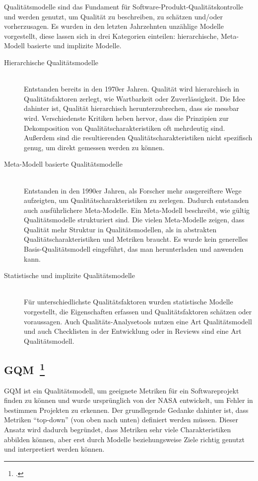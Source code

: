 Qualitätsmodelle sind das Fundament für Software-Produkt-Qualitätskontrolle und werden genutzt, um Qualität zu beschreiben, zu schätzen und/oder vorherzusagen.
Es wurden in den letzten Jahrzehnten unzählige Modelle vorgestellt, diese lassen sich in drei Kategorien einteilen: hierarchische, Meta-Modell basierte und implizite Modelle.

\begin{description}
  \item[Hierarchische Qualitätsmodelle] \hfill \\ Entstanden bereits in den 1970er Jahren. Qualität wird hierarchisch in Qualitätsfaktoren zerlegt, wie Wartbarkeit oder Zuverlässigkeit. Die Idee dahinter ist, Qualität hierarchisch herunterzubrechen, dass sie messbar wird. Verschiedenste Kritiken heben hervor, dass die Prinzipien zur Dekomposition von Qualitätscharakteristiken oft mehrdeutig sind. Außerdem sind die resultierenden Qualitätscharakteristiken nicht spezifisch genug, um direkt gemessen werden zu können.
  \item[Meta-Modell basierte Qualitätsmodelle] \hfill \\ Entstanden in den 1990er Jahren, als Forscher mehr ausgereiftere Wege aufzeigten, um Qualitätscharakteristiken zu zerlegen. Dadurch entstanden auch ausführlichere Meta-Modelle. Ein Meta-Modell beschreibt, wie gültig Qualitätsmodelle strukturiert sind. Die vielen Meta-Modelle zeigen, dass Qualität mehr Struktur in Qualitätsmodellen, als in abstrakten Qualitätscharakteristiken und Metriken braucht. Es wurde kein generelles Basis-Qualitätsmodell eingeführt, das man herunterladen und anwenden kann.
  \item[Statistische und implizite Qualitätsmodelle] \hfill \\ Für unterschiedlichste Qualitätsfaktoren wurden statistische Modelle vorgestellt, die Eigenschaften erfassen und Qualitätsfaktoren schätzen oder voraussagen. Auch Qualitäts-Analysetools nutzen eine Art Qualitätsmodell und auch Checklisten in der Entwicklung oder in Reviews sind eine Art Qualitätsmodell.
\end{description}

\clearpage
\subsection[\ac{GQM}]{\ac{GQM}~\footcite[][]{basili_goal_nodate}}

\ac{GQM} ist ein Qualitätsmodell, um geeignete Metriken für ein Softwareprojekt finden zu können und wurde ursprünglich von der \ac{NASA} entwickelt, um Fehler in bestimmen Projekten zu erkennen.
Der grundlegende Gedanke dahinter ist, dass Metriken ``top\mbox{-}down'' (von oben nach unten) definiert werden müssen.
Dieser Ansatz wird dadurch begründet, dass Metriken sehr viele Charakteristiken abbilden können, aber erst durch Modelle beziehungsweise Ziele richtig genutzt und interpretiert werden können.

